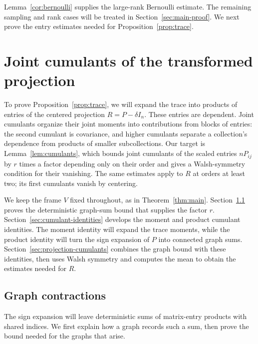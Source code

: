 \documentclass[11pt]{article}
\theoremstyle{definition}
\theoremstyle{remark}
\theoremstyle{plain}
\begin{document}
Lemma~\ref{cor:bernoulli} supplies the large-rank Bernoulli estimate.
The remaining sampling and rank cases will be treated in
Section~\ref{sec:main-proof}. We next prove the entry estimates
needed for Proposition~\ref{prop:trace}.

\section{Joint cumulants of the transformed projection}
\label{sec:cumulants}

To prove Proposition~\ref{prop:trace}, we will expand the trace into
products of entries of the centered projection $R=P-\delta I_n$.
These entries are dependent. Joint cumulants organize their joint
moments into contributions from blocks of entries: the second
cumulant is covariance, and higher cumulants separate a collection's
dependence from products of smaller subcollections. Our target is
Lemma~\ref{lem:cumulants}, which bounds joint cumulants of the scaled
entries $nP_{ij}$ by $r$ times a factor depending only on their order
and gives a Walsh-symmetry condition for their vanishing. The same
estimates apply to $R$ at orders at least two; its first cumulants
vanish by centering.

We keep the frame $V$ fixed throughout, as in Theorem~\ref{thm:main}.
Section~\ref{sec:graph-contractions} proves the deterministic
graph-sum bound that supplies the factor $r$.
Section~\ref{sec:cumulant-identities} develops the moment and product
cumulant identities. The moment identity will expand the trace
moments, while the product identity will turn the sign expansion of
$P$ into connected graph sums. Section~\ref{sec:projection-cumulants}
combines the graph bound with these identities, then uses Walsh
symmetry and computes the mean to obtain the estimates needed for $R$.

\subsection{Graph contractions}\label{sec:graph-contractions}

The sign expansion will leave deterministic sums of matrix-entry
products with shared indices. We first explain how a graph records
such a sum, then prove the bound needed for the graphs that arise.
\end{document}
